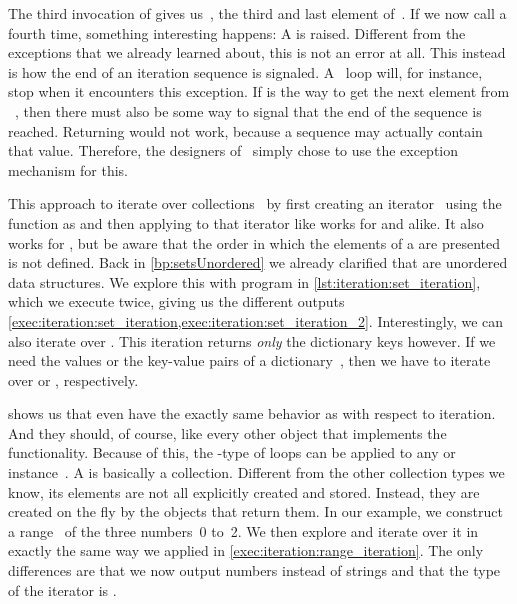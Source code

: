 The third invocation of  gives us~, the third and last element of~.
If we now call  a fourth time, something interesting happens:
A  is raised.
Different from the exceptions that we already learned about, this is not an error at all.
This instead is how the end of an iteration sequence is signaled.
A ~loop will, for instance, stop when it encounters this exception.
If  is the way to get the next element from ~, then there must also be some way to signal that the end of the sequence is reached.
Returning  would not work, because a sequence may actually contain that value.
Therefore, the designers of \python\ simply chose to use the exception mechanism for this.

This approach to iterate over collections~ by first creating an iterator~ using the  function as  and then applying  to that iterator like  works for  and  alike.
It also works for , but be aware that the order in which the elements of a  are presented is not defined.
Back in \cref{bp:setsUnordered} we already clarified that  are unordered data structures.
We explore this with program  in \cref{lst:iteration:set_iteration}, which we execute twice, giving us the different outputs \cref{exec:iteration:set_iteration,exec:iteration:set_iteration_2}.
Interestingly, we can also iterate over .
This iteration returns \emph{only} the dictionary keys however.
If we need the values or the key-value pairs of a dictionary~, then we have to iterate over  or , respectively.

 shows us that even  have the exactly same behavior as  with respect to iteration.
And they should, of course, like every other object that implements the~ functionality.
Because of this, the -type of loops can be applied to any  or  instance~.%
A  is basically a collection.
Different from the other collection types we know, its elements are not all explicitly created and stored.
Instead, they are created on the fly by the  objects that return them.
In our example, we construct a range~ of the three numbers~0 to~2.
We then explore and iterate over it in exactly the same way we applied in \cref{exec:iteration:range_iteration}.
The only differences are that we now output numbers instead of strings and that the type of the iterator is .

